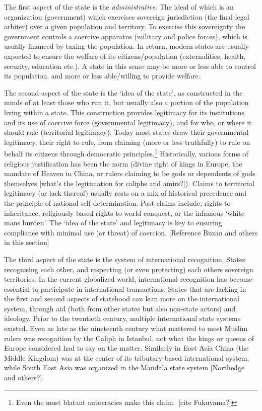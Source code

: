 \documentclass[12pt]{article}
\begin{document}
The first aspect of the state is the \textit{administrative}. The ideal of
which is an organization (government) which exercises sovereign jurisdiction
(the final legal arbiter) over a given population and territory. To exercise
this sovereignty the government controls a coercive apparatus (military and
police forces), which is usually financed by taxing the population. In return,
modern states are usually expected to ensure the welfare of its
citizens/population (externalities, health, security, education etc.). A state
in this sense may be more or less able to control its population, and more or
less able/willing to provide welfare.

The second aspect of the state is the `idea of the state', as constructed in
the minds of at least those who run it, but usually also a portion of the
population living within a state. This construction provides legitimacy for its
institutions and its use of coercive force (governmental legitimacy), and for
who, or where it should rule (territorial legitimacy). Today most states draw
their governmental legitimacy, their right to rule, from claiming (more or less
truthfully) to rule on behalf its citizens through democratic
principles.\footnote{Even the most blatant autocracies make this claim. [cite
Fukuyama?]} Historically, various forms of religious justification has been the
norm (divine right of kings in Europe, the mandate of Heaven in China, or rulers
claiming to be gods or dependents of gods themselves [what's the legitimation
for caliphs and amirs?]). Claims to territorial legitimacy (or lack thereof)
usually rests on a mix of historical precedence and the principle of national
self determination. Past claims include, rights to inheritance, religiously
based rights to world conquest, or the infamous `white mans burden'. The
`idea of the state' and legitimacy is key to ensuring compliance with minimal
use (or threat) of coercion. [Reference Buzan and others in this section]

The third aspect of the state is the system of international recognition. States
recognising each other, and respecting (or even protecting) each others
sovereign territories. In the current globalized world, international
recognition has become essential to participate in international transactions.
States that are lacking in the first and second aspects of statehood can lean
more on the international system, through aid (both from other states but also
non-state actors) and ideology. Prior to the twentieth century, multiple
international state systems existed. Even as late as the nineteenth century what
mattered to most Muslim rulers was recognition by the Caliph in Istanbul, not
what the kings or queens of Europe considered had to say on the matter.
Similarly in East Asia China (the Middle Kingdom) was at the center of its
tributary-based international system, while South East Asia was organized in the
Mandala state system [Northedge and others?].
\end{document}
